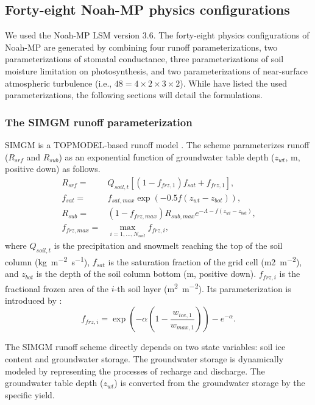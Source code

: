 \documentclass[essd]{copernicus}
\begin{document}
\subsection{Forty-eight Noah-MP physics configurations} \label{sec:data:noahmp}

We used the Noah-MP LSM version 3.6. The forty-eight physics configurations of
Noah-MP are generated by combining four runoff parameterizations, two
parameterizations of stomatal conductance, three parameterizations of soil
moisture limitation on photosynthesis, and two parameterizations of near-surface
atmospheric turbulence (i.e., $48 = 4 \times 2 \times 3 \times 2$). While
\citet[Table 1]{zheng2019WRR} have listed the used parameterizations, the
following sections will detail the formulations.

\subsubsection{The SIMGM runoff parameterization}

SIMGM is a TOPMODEL-based runoff model \citep{niu2007JGRA}. The scheme
parameterizes runoff ($R_{srf}$ and $R_{sub}$) as an exponential function of
groundwater table depth ($z_{wt}$, \unit{m}, positive down) as follows.
\begin{align}
    R_{srf} =     & Q_{soil,t} [(1 - f_{frz,1}) f_{sat} + f_{frz,1} ] \text{,}                \\
    f_{sat} =     & f_{sat,max} \exp(-0.5 f (z_{wt} - z_{bot})) \text{,}                      \\
    R_{sub} =     & (1 - f_{frz,max}) R_{sub,max} e^{-\Lambda - f(z_{wt} - z_{bot})} \text{,} \\
    f_{frz,max} = & \max_{i=1,\dots,N_{soil}} f_{frz,i} \text{,}
\end{align}
where $Q_{soil,t}$ is the precipitation and snowmelt reaching the top of the
soil column (\unit{kg~m^{-2}~s^{-1}}), $f_{sat}$ is the saturation fraction of
the grid cell (\unit{m2~m^{-2}}), and $z_{bot}$ is the depth of the soil column
bottom (\unit{m}, positive down). $f_{frz,i}$ is the fractional frozen area of
the $i$-th soil layer (\unit{m^2~m^{-2}}). Its parameterization is introduced by
\citet{niu2006JH}:
\begin{equation}
    f_{frz,i} = \exp\left(-\alpha(1 - \frac{w_{ice,1}}{w_{max,1}})\right) - e^{-\alpha} \text{.}
\end{equation}

The SIMGM runoff scheme directly depends on two state variables: soil ice
content and groundwater storage. The groundwater storage is dynamically modeled
by representing the processes of recharge and discharge. The groundwater table
depth ($z_{wt}$) is converted from the groundwater storage by the specific
yield.
\end{document}
